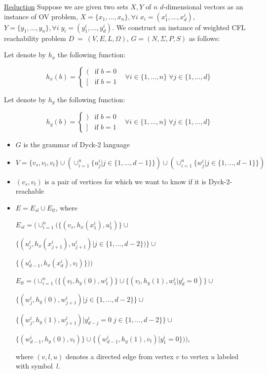 \documentclass[12pt]{article}
\begin{document}
\underline{Reduction}
Suppose we are given two sets $X, Y$ of $n$ $d$-dimensional vectors as an instance of OV problem, $X = \{x_1, \ldots, x_n\}, \forall i \; x_i = (x^i_1, \ldots, x^i_d)$, $Y = \{y_1, \ldots, y_n\}, \forall i \; y_i = (y^i_1, \ldots, y^i_d)$. We construct an instance of weighted CFL reachability problem $D~=~(V, E, L, \Omega)$, $G = (N, \Sigma, P, S)$ as follows:

Let denote by $h_x$ the following function: 

$$h_x(b) = 
\begin{cases}
( &\text{if $b = 0$}\\
[ &\text{if $b = 1$}
\end{cases} \;\;\; \forall i \in \{1, \ldots, n\} \; \forall j \in \{1, \ldots, d\}$$

Let denote by $h_y$ the following function: 

$$h_y(b) = 
\begin{cases}
) &\text{if $b = 0$}\\
] &\text{if $b = 1$}
\end{cases} \;\;\; \forall i \in \{1, \ldots, n\} \; \forall j \in \{1, \ldots, d\}$$

\begin{itemize}
    \item $G$ is the grammar of Dyck-2 language
    \item $V = \{v_s, v_l, v_t\} \cup (\cup_{i = 1}^n \{u^i_j|j \in \{1, \ldots, d - 1\}\}) \cup (\cup_{i = 1}^n \{w^i_j|j \in \{1, \ldots, d - 1\}\})$
    \item $(v_s, v_t)$ is a pair of vertices for which we want to know if it is Dyck-2-reachable
    \item $E = E_{sl} \cup E_{lt}$, where
    
    $E_{sl} = (\cup_{i=1}^n (\{(v_s, h_x(x^i_1), u^i_1)\} \cup$
    
    $\{(u^i_j, h_x(x^i_{j + 1}), u^i_{j + 1})|j \in \{1, \ldots, d - 2\})\} \cup $
    
    $\{(u^i_{d - 1}, h_x(x^i_d), v_l)\}))$
    
    $E_{lt} = (\cup_{i=1}^n (\{(v_l, h_y(0), w^i_1)\} \cup \{(v_l, h_y(1), w^i_1|y^i_d = 0)\} \cup$
    
    $\{(w^i_j, h_y(0), w^i_{j + 1})|j \in \{1, \ldots, d - 2\}\} \cup$

    $\{(w^i_j, h_y(1), w^i_{j + 1})|y^i_{d-j} = 0 \; j \in \{1, \ldots, d - 2\}\} \cup$
    
    $\{(w^i_{d - 1}, h_y(0), v_t)\} \cup
    \{(w^i_{d - 1}, h_y(1), v_t)|y^i_1 = 0\}))$,
    
    where $(v, l, u)$ denotes a directed edge from vertex $v$ to vertex $u$ labeled with symbol~$l$.
\end{itemize}
\end{document}
